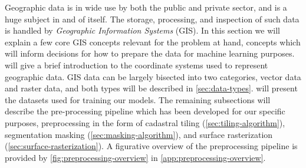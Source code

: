 Geographic data is in wide use by both the public and private sector, and is a huge subject in and of itself.
The storage, processing, and inspection of such data is handled by \textit{Geographic Information Systems} (GIS).
In this section we will explain a few core GIS concepts relevant for the problem at hand, concepts which will inform decisions for how to prepare the data for machine learning purposes.
 will give a brief introduction to the coordinate systems used to represent geographic data.
GIS data can be largely bisected into two categories, vector data and raster data, and both types will be described in \cref{sec:data-types}.
 will present the datasets used for training our models.
The remaining subsections will describe the pre-processing pipeline which has been developed for our specific purposes, preprocessing in the form of cadastral tiling (\cref{sec:tiling-algorithm}), segmentation masking (\cref{sec:masking-algorithm}), and surface rasterization (\cref{sec:surface-rasterization}).
A figurative overview of the preprocessing pipeline is provided by \cref{fig:preprocessing-overview} in \cref{app:preprocessing-overview}.
